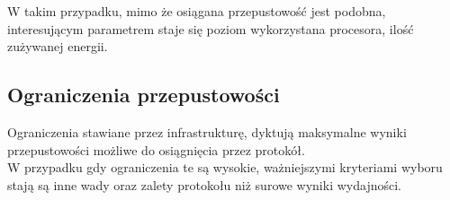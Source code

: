 W takim przypadku, mimo że osiągana przepustowość jest podobna, interesującym parametrem staje się poziom wykorzystana procesora, ilość zużywanej energii.

\subsection{Ograniczenia przepustowości}

Ograniczenia stawiane przez infrastrukturę, dyktują maksymalne wyniki przepustowości możliwe do osiągnięcia przez protokół.\\

W przypadku gdy ograniczenia te są wysokie, ważniejszymi kryteriami wyboru stają są inne wady oraz zalety protokołu niż surowe wyniki wydajności.